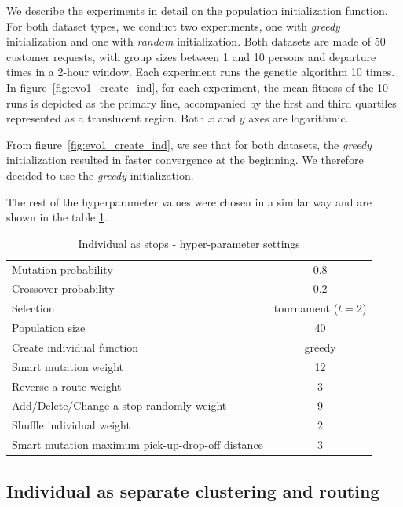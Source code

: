 \label{experiment_graph_description}
We describe the experiments in detail on the population initialization function. For both dataset types, we conduct two experiments, one with \textit{greedy} initialization and one with \textit{random} initialization. Both datasets are made of 50 customer requests, with group sizes between 1 and 10 persons and departure times in a 2-hour window. Each experiment runs the genetic algorithm 10 times. In figure~\ref{fig:evo1_create_ind}, for each experiment, the mean fitness of the 10 runs is depicted as the primary line, accompanied by the first and third quartiles represented as a translucent region. Both $x$ and $y$ axes are logarithmic.

From figure~\ref{fig:evo1_create_ind}, we see that for both datasets, the \textit{greedy} initialization resulted in faster convergence at the beginning. We therefore decided to use the \textit{greedy} initialization.

The rest of the hyperparameter values were chosen in a similar way and are shown in the table \ref{tab:evo_stops_hyperparams}.

\begin{table}[ht]
    \centering
    \begin{tabular}{lc}
        Mutation probability & 0.8 \\
        Crossover probability & 0.2 \\
        Selection & tournament ($t=2$) \\
        Population size & 40 \\
        Create individual function & greedy \\
        Smart mutation weight & 12 \\
        Reverse a route weight & 3 \\
        Add/Delete/Change a stop randomly weight & 9 \\
        Shuffle individual weight & 2 \\
        Smart mutation maximum pick-up-drop-off distance & 3 \\
    \end{tabular}
    \caption{Individual as stops - hyper-parameter settings}
    \label{tab:evo_stops_hyperparams}
\end{table}

\subsection{Individual as separate clustering and routing}

